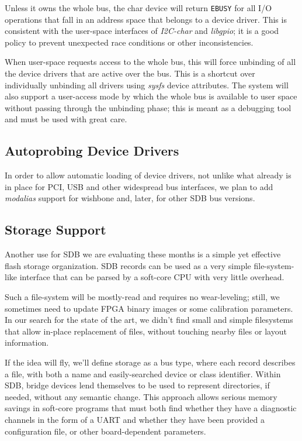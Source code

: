 \documentclass[a4paper, 12pt]{article}
\begin{document}
Unless it owns the whole bus, the char device will return \texttt{EBUSY} for
all I/O operations that fall in an address space that belongs to a
device driver. This is consistent with the user-space interfaces of
\textit{I2C-char} and \textit{libgpio}; it is a good policy to prevent
unexpected race conditions or other inconsistencies.

When user-space requests access to the whole bus, this will force
unbinding of all the device drivers that are active over the bus.
This is a shortcut over individually unbinding all drivers using
\textit{sysfs} device attributes. The system will also support
a user-access mode by which the whole bus is available to
user space without passing through the unbinding phase; this is
meant as a debugging tool and must be used with great care.


\subsection{Autoprobing Device Drivers}

In order to allow automatic loading of device drivers, not unlike
what already is in place for PCI, USB and other widespread bus
interfaces, we plan to add \textit{modalias} support for wishbone
and, later, for other SDB bus versions.

\subsection{Storage Support}

Another use for SDB we are evaluating these months is a simple yet
effective flash storage organization.  SDB records can be used as a
very simple file-system-like interface that can be parsed by a
soft-core CPU with very little overhead.

Such a file-system will be mostly-read and requires no wear-leveling;
still, we sometimes need to update FPGA binary images or some
calibration parameters.  In our search for the state of the art, we
didn't find small and simple filesystems that allow in-place
replacement of files, without touching nearby files or layout
information.

If the idea will fly, we'll define storage as a bus type, where each
record describes a file, with both a name and easily-searched device
or class identifier.  Within SDB, bridge devices lend themselves to be
used to represent directories, if needed, without any semantic change.
This approach allows serious memory savings in soft-core programs that
must both find whether they have a diagnostic channels in the form of
a UART and whether they have been provided a configuration file, or
other board-dependent parameters.
\end{document}
